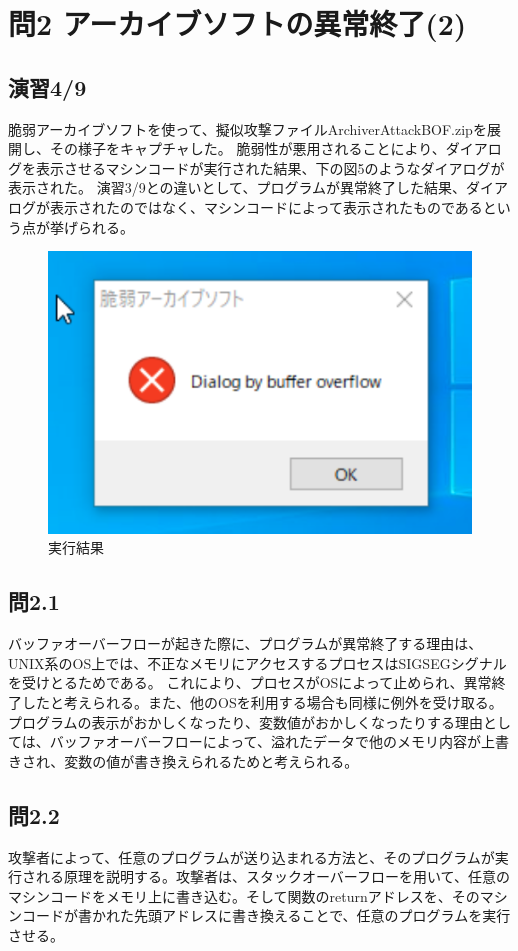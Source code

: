 \documentclass[dvipdfmx,autodetect-engine,titlepage]{jsarticle}
\begin{document}
\section{問2 アーカイブソフトの異常終了(2)}
\subsection{演習4/9}
脆弱アーカイブソフトを使って、擬似攻撃ファイルArchiverAttackBOF.zipを展開し、その様子をキャプチャした。
脆弱性が悪用されることにより、ダイアログを表示させるマシンコードが実行された結果、下の図5のようなダイアログが表示された。
演習3/9との違いとして、プログラムが異常終了した結果、ダイアログが表示されたのではなく、マシンコードによって表示されたものであるという点が挙げられる。\\
\begin{figure}[H]
  \centering
  \includegraphics[scale=0.8]{fg5.png}
  \caption{実行結果}\label{fig:図5}
\end{figure}

\subsection{問2.1}
バッファオーバーフローが起きた際に、プログラムが異常終了する理由は、UNIX系のOS上では、不正なメモリにアクセスするプロセスはSIGSEGシグナルを受けとるためである。
これにより、プロセスがOSによって止められ、異常終了したと考えられる。また、他のOSを利用する場合も同様に例外を受け取る。
プログラムの表示がおかしくなったり、変数値がおかしくなったりする理由としては、バッファオーバーフローによって、溢れたデータで他のメモリ内容が上書きされ、変数の値が書き換えられるためと考えられる。

\subsection{問2.2}
攻撃者によって、任意のプログラムが送り込まれる方法と、そのプログラムが実行される原理を説明する。攻撃者は、スタックオーバーフローを用いて、任意のマシンコードをメモリ上に書き込む。そして関数のreturnアドレスを、そのマシンコードが書かれた先頭アドレスに書き換えることで、任意のプログラムを実行させる。\\
\end{document}
